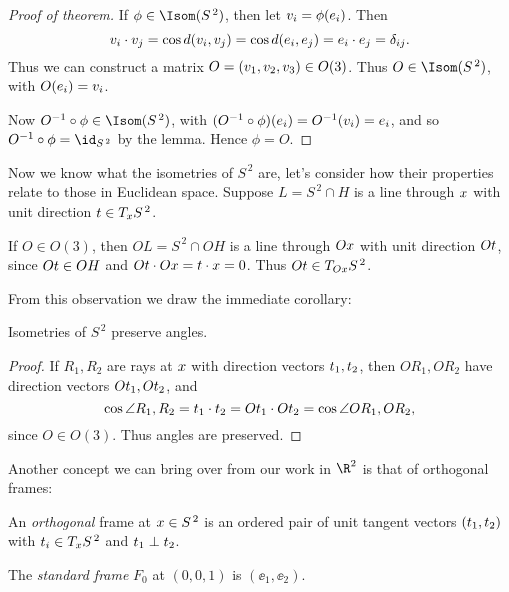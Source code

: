 \begin{proof}
	[Proof of theorem] If $\phi\in\Isom(S^{\,2})$, then let $\vv_i = \phi(\ee_i)$. Then
	\begin{equation*}
		\vv_i \cdot \vv_j = \cos d(\vv_i,\vv_j) = \cos d(\ee_i,\ee_j) = \ee_i \cdot \ee_j = \delta_{ij}. %
	\end{equation*}
	Thus we can construct a matrix $O=(\vv_1,\vv_2,\vv_3) \in O(3)$. Thus $O\in\Isom(S^{\,2})$, with $O(\ee_i) = \vv_i$.

	Now $O^{-1}\circ\phi \in \Isom(S^{\,2})$, with $(O^{-1}\circ \phi)(\ee_i) = O^{-1}(\vv_i) = \ee_i$, and so $O^{-1} \circ \phi = \id_{S^{\,2}}$ by the lemma. Hence $\phi=O$. %
\end{proof}

Now we know what the isometries of $S^{\,2}$ are, let's consider how their properties relate to those in Euclidean space. Suppose $L=S^{\,2}\cap H$ is a line through $\xx$ with unit direction $\tt\in T_\xx S^{\,2}$.

If $O\in O(3)$, then $OL = S^{\,2} \cap OH$ is a line through $O\xx$ with unit direction $O\tt$, since $O\tt \in OH$ and $O\tt \cdot O\xx = \tt \cdot \xx = 0$. Thus $O\tt \in T_{O\xx} S^{\,2}$.

From this observation we draw the immediate corollary:

\vspace{2pt}

\begin{corollary}
	Isometries of $S^{\,2}$ preserve angles. %
\end{corollary}

\begin{proof}
	If $R_1,R_2$ are rays at $\xx$ with direction vectors $\tt_1, \tt_2$, then $OR_1, OR_2$ have direction vectors $O\tt_1, O\tt_2$, and %
	\begin{equation*}
		\cos \angle R_1, R_2 = \tt_1 \cdot \tt_2 = O\tt_1 \cdot O\tt_2 = \cos \angle OR_1, OR_2,
	\end{equation*}
	since $O\in O(3)$. Thus angles are preserved.
\end{proof}

Another concept we can bring over from our work in $\R^2$ is that of orthogonal frames:

\begin{definition}
	An \emph{orthogonal} frame at $\xx\in S^{\,2}$ is an ordered pair of unit tangent vectors $(\tt_1,\tt_2)$ with $\tt_i \in T_\xx S^{\,2}$ and $\tt_1 \perp \tt_2$. %
	

	The \emph{standard frame} $F_0$ at $(0,0,1)$ is $(\ee_1,\ee_2)$. %
\end{definition}

